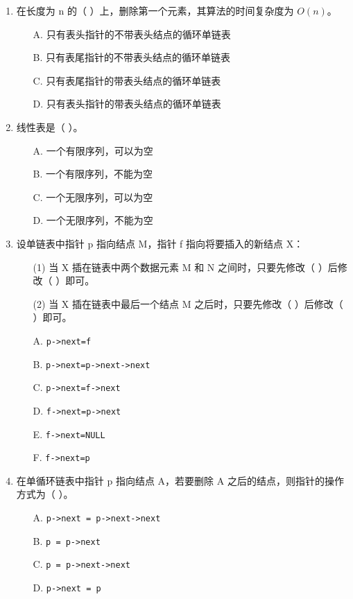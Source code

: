 \documentclass[12pt, a4paper]{article}
\begin{document}
\begin{enumerate}
    \item 在长度为 n 的（ ）上，删除第一个元素，其算法的时间复杂度为 $O(n)$。
    \begin{enumerate}
        \item[A.] 只有表头指针的不带表头结点的循环单链表
        \item[B.] 只有表尾指针的不带表头结点的循环单链表
        \item[C.] 只有表尾指针的带表头结点的循环单链表
        \item[D.] 只有表头指针的带表头结点的循环单链表
    \end{enumerate}
    
    \item 线性表是（ ）。
    \begin{enumerate}
        \item[A.] 一个有限序列，可以为空
        \item[B.] 一个有限序列，不能为空
        \item[C.] 一个无限序列，可以为空
        \item[D.] 一个无限序列，不能为空
    \end{enumerate}
    
    \item 设单链表中指针 p 指向结点 M，指针 f 指向将要插入的新结点 X：
    \begin{enumerate}
        \item[(1)] 当 X 插在链表中两个数据元素 M 和 N 之间时，只要先修改（ ）后修改（ ）即可。
        \item[(2)] 当 X 插在链表中最后一个结点 M 之后时，只要先修改（ ）后修改（ ）即可。
        \item[A.] \texttt{p->next=f}
        \item[B.] \texttt{p->next=p->next->next}
        \item[C.] \texttt{p->next=f->next}
        \item[D.] \texttt{f->next=p->next}
        \item[E.] \texttt{f->next=NULL}
        \item[F.] \texttt{f->next=p}
    \end{enumerate}
    
    \item 在单循环链表中指针 p 指向结点 A，若要删除 A 之后的结点，则指针的操作方式为（ ）。
    \begin{enumerate}
        \item[A.] \texttt{p->next = p->next->next}
        \item[B.] \texttt{p = p->next}
        \item[C.] \texttt{p = p->next->next}
        \item[D.] \texttt{p->next = p}
    \end{enumerate}
    

\end{enumerate}
\end{document}
